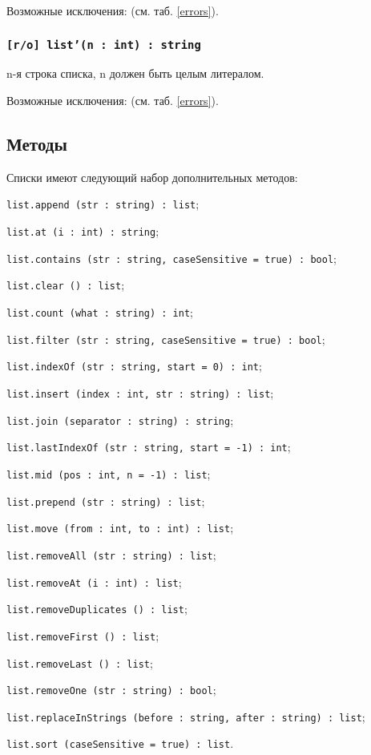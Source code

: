 Возможные исключения:  (см. таб. \ref{errors}).

\subsubsection{\texttt{[r/o] list'(n : int) : string}}

n-я строка списка, n должен быть целым литералом.

Возможные исключения:  (см. таб. \ref{errors}).

\subsection{Методы}

Списки имеют следующий набор дополнительных методов:
\begin{icItems}
\item \texttt{list.append (str : string) : list};
\item \texttt{list.at (i : int) : string};
\item \texttt{list.contains (str : string, caseSensitive = true) : bool};
\item \texttt{list.clear () : list};
\item \texttt{list.count (what : string) : int};
\item \texttt{list.filter (str : string, caseSensitive = true) : bool};
\item \texttt{list.indexOf (str : string, start = 0) : int};
\item \texttt{list.insert (index : int, str : string) : list};
\item \texttt{list.join (separator : string) : string};
\item \texttt{list.lastIndexOf (str : string, start = -1) : int};
\item \texttt{list.mid (pos : int, n = -1) : list};
\item \texttt{list.prepend (str : string) : list};
\item \texttt{list.move (from : int, to : int) : list};
\item \texttt{list.removeAll (str : string) : list};
\item \texttt{list.removeAt (i : int) : list};
\item \texttt{list.removeDuplicates () : list};
\item \texttt{list.removeFirst () : list};
\item \texttt{list.removeLast () : list};
\item \texttt{list.removeOne (str : string) : bool};
\item \texttt{list.replaceInStrings (before : string, after : string) : list};
\item \texttt{list.sort (caseSensitive = true) : list}.
\end{icItems}

